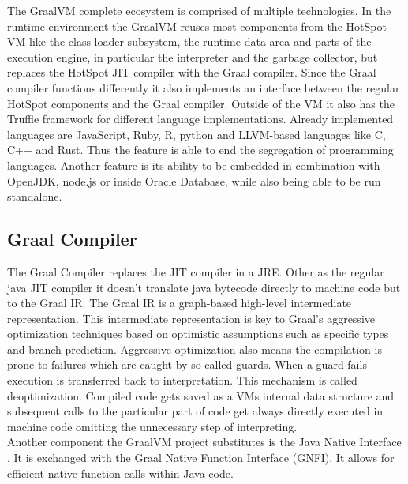 The GraalVM complete ecosystem is comprised of multiple technologies. In the runtime environment the GraalVM reuses most components from the HotSpot VM like the class loader subsystem, the runtime data area and parts of the execution engine, in particular the interpreter and the garbage collector, but replaces the HotSpot JIT compiler with the Graal compiler. Since the Graal compiler functions differently it also implements an interface between the regular HotSpot components and the Graal compiler. Outside of the VM it also has the Truffle framework for different language implementations. Already implemented languages are JavaScript, Ruby, R, python and LLVM-based languages like C, C++ and Rust. Thus the feature is able to end the segregation of programming languages. Another feature is its ability to be embedded in combination with OpenJDK, node.js or inside Oracle Database, while also being able to be run standalone.
\subsection{Graal Compiler}
The Graal Compiler replaces the JIT compiler in a JRE. Other as the regular java JIT compiler it doesn't translate java bytecode directly to machine code but to the Graal IR. \cite{inproceedings} The Graal IR is a graph-based high-level intermediate representation. This intermediate representation is key to Graal's aggressive optimization techniques based on optimistic assumptions such as specific types and branch prediction. Aggressive optimization also means the compilation is prone to failures which are caught by so called guards. When a guard fails execution is transferred back to interpretation. This mechanism is called deoptimization. \cite{ChambDeopt} Compiled code gets saved as a VMs internal data structure and subsequent calls to the particular part of code get always directly executed in machine code omitting the unnecessary step of interpreting.\\
Another component the GraalVM project substitutes is the Java Native Interface \cite{Lindholm}. It is exchanged with the Graal Native Function Interface (GNFI). \cite{grimmerNative} It allows for efficient native function calls within Java code.
